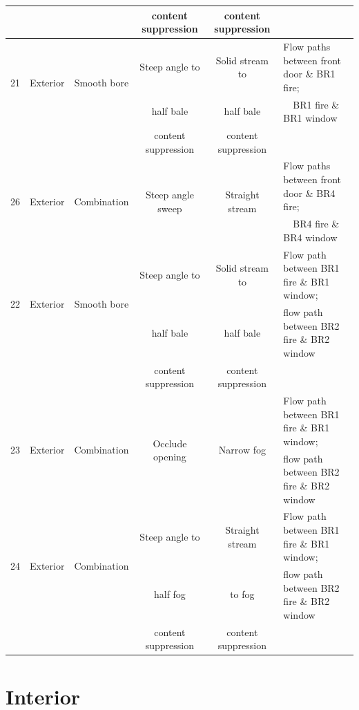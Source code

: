 \documentclass[12pt,oneside]{book}
\begin{document}
\begin{table}[H]
{\begin{tabular}{|c|c|c|c|c|l|}
					&							&								& content suppression 			& content suppression 	&							\\
\hline \hline
\multirow{2}{*}{21}	& \multirow{2}{*}{Exterior} & \multirow{2}{*}{Smooth bore} 	& Steep angle to 			&  Solid stream to 		& Flow paths between front door \& BR1 fire; 	\\
 					& 							& 								& half bale 			&  half bale 		& ~~BR1 fire \& BR1 window \\
					&							&								& content suppression 			& content suppression 	&							\\
\hline \hline
\multirow{2}{*}{26}	& \multirow{2}{*}{Exterior} & \multirow{2}{*}{Combination} 	& \multirow{2}{*}{Steep angle sweep} &  \multirow{2}{*}{Straight stream} & Flow paths between front door \& BR4 fire; 	\\
 					& 							& 								& 							&  						& ~~BR4 fire \& BR4 window 	\\
\hline \hline
\multirow{2}{*}{22}	& \multirow{2}{*}{Exterior} & \multirow{2}{*}{Smooth bore} 	& Steep angle to 				&  	Solid stream to 	& 	Flow path between BR1 fire \& BR1 window;~ 	\\
 					& 							& 								& half bale   					&  	half bale 		& 	flow path between BR2 fire \& BR2 window 	\\
					&							&								& content suppression 			& content suppression 	&							\\
\hline
\multirow{2}{*}{23}	& \multirow{2}{*}{Exterior} & \multirow{2}{*}{Combination} 	& \multirow{2}{*}{Occlude opening} 	&  \multirow{2}{*}{Narrow fog} 	& Flow path between BR1 fire \& BR1 window;~ 	\\
 					& 							& 								& 									&  								& flow path between BR2 fire \& BR2 window \\
\hline
\multirow{2}{*}{24}	& \multirow{2}{*}{Exterior} & \multirow{2}{*}{Combination} 	& Steep angle to 					&  Straight stream 		& Flow path between BR1 fire \& BR1 window;~ 	\\
 					& 							& 								& half fog 					&  to fog 			& flow path between BR2 fire \& BR2 window 	\\
					&							&								& content suppression 			& content suppression 	&							\\
\hline
\end{tabular}}
\label{table:summary_of_experiments}
\end{table}

\section{Interior}
\end{document}

